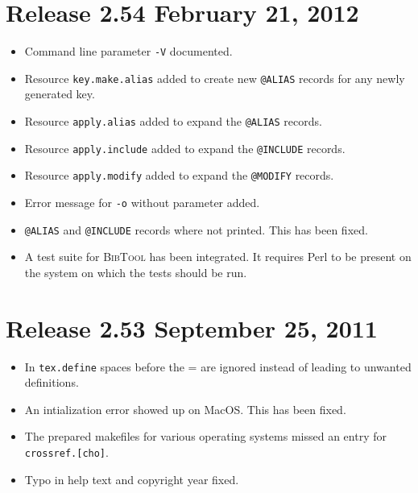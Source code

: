 \documentclass[11pt,a4paper]{scrartcl}
\newcommand\Arg[1]{\texttt{#1}}
\newcommand\rsc[1]{\texttt{#1}}
\newcommand\BibTool{\textsc{BibTool}}
\newenvironment{Release}[2]{%
  \def\tmp{#2}%
  \section*{Release #1 \ifx\tmp\empty\else{\normalsize[#2]}\fi}
  \begin{itemize}
}{\end{itemize}}
\newenvironment{Fix}[1]{\item }{}
\newenvironment{New}[1]{\item }{}
\newenvironment{Update}[1]{\item }{}
\begin{document}
\begin{multicols}
 \begin{Release}{2.54}{February 21, 2012}
  \begin{New}{gene}
    Command line parameter \Arg{-V} documented.
  \end{New}
  \begin{New}{gene}
    Resource \rsc{key.make.alias} added to create new \texttt{@ALIAS}
    records for any newly generated key.
  \end{New}
  \begin{New}{gene}
    Resource \rsc{apply.alias} added to expand the \texttt{@ALIAS}
    records.
  \end{New}
  \begin{New}{gene}
    Resource \rsc{apply.include} added to expand the \texttt{@INCLUDE}
    records.
  \end{New}
  \begin{New}{gene}
    Resource \rsc{apply.modify} added to expand the \texttt{@MODIFY}
    records.
  \end{New}
  \begin{Update}{gene}
    Error message for \Arg{-o} without parameter added.
  \end{Update}
  \begin{Fix}{gene}
    \texttt{@ALIAS} and \texttt{@INCLUDE} records where not printed.
    This has been fixed.
  \end{Fix}
  \begin{New}{gene}
    A test suite for \BibTool{} has been integrated. It requires Perl
    to be present on the system on which the tests should be run.
  \end{New}
 \end{Release}

 \begin{Release}{2.53}{September 25, 2011}
  \begin{Update}{gene}
    In \texttt{tex.define} spaces before the = are ignored instead of
    leading to unwanted definitions.
  \end{Update}
  \begin{Fix}{gene}
    An intialization error showed up on MacOS. This has been fixed.
  \end{Fix}
  \begin{Fix}{gene}
    The prepared makefiles for various operating systems missed an
    entry for \texttt{crossref.[cho]}.
  \end{Fix}
  \begin{Fix}{gene}
    Typo in help text and copyright year fixed.
  \end{Fix}
 \end{Release}


\end{multicols}
\end{document}
